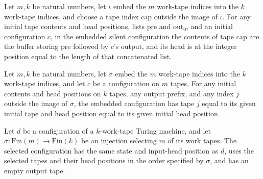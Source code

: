 \begin{theorem}
\label{Turing.embedSilentCfg_cap}
\leanok
{}
Let $m,k$ be natural numbers, let $\iota$ embed the $m$ work-tape indices into the $k$
work-tape indices, and choose a tape index $\mathrm{cap}$ outside the image of $\iota$.
For any initial tape contents and head positions, lists $\mathrm{pre}$ and
$\mathrm{out}_0$, and an initial configuration $c$, in the embedded silent configuration
the contents of tape $\mathrm{cap}$ are the buffer storing $\mathrm{pre}$ followed by
$c$'s output, and its head is at the integer position equal to the length of that
concatenated list.
\end{theorem}

\begin{theorem}
\label{Turing.embedEmitCfg_unselected}
\leanok
{}
Let $m,k$ be natural numbers, let $\sigma$ embed the $m$ work-tape indices into the $k$
work-tape indices, and let $c$ be a configuration on $m$ tapes. For any initial contents
and head positions on $k$ tapes, any output prefix, and any index $j$ outside the image
of $\sigma$, the embedded configuration has tape $j$ equal to its given initial tape and
head position equal to its given initial head position.
\end{theorem}

\begin{definition}
\label{Turing.Cfg.select}
\leanok
{}
Let $d$ be a configuration of a $k$-work-tape Turing machine, and let
$\sigma:\mathrm{Fin}(m)\to\mathrm{Fin}(k)$ be an injection selecting $m$ of its work
tapes. The selected configuration has the same state and input-head position as $d$,
uses the selected tapes and their head positions in the order specified by $\sigma$, and
has an empty output tape.
\end{definition}

